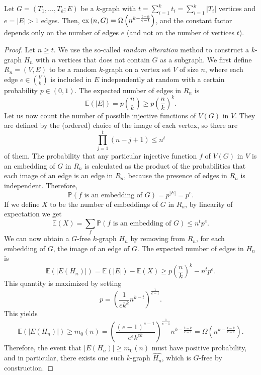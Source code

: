 \begin{proposition} \label{prop:probabilistic-lower-bound} %
    Let $G = (T_1, \dots, T_k; E)$ be a $k$-graph with
    $t = \sum_{i=1}^{k} t_i = \sum_{i=1}^{k} |T_i|$ vertices
    and $e = |E| > 1$ edges.
    Then, $\text{ex} \left( n, G \right) = \Omega\left(n^{k - \frac{t - k}{e - 1}} \right)$, and the
    constant factor depends only on the number of edges $e$ (and not on the number of vertices $t$).
    \begin{proof}
        Let $n \geq t$.
        We use the so-called \emph{random alteration} method to construct a $k$-graph
        $H_n$ with $n$ vertices that does not contain $G$ as a subgraph.
        We first define $R_n = (V, E)$ to be a random $k$-graph on a vertex set $V$ of size $n$,
        where each edge $e \in \binom{V}{k}$ is included in $E$ independently at random
        with a certain probability $p \in (0, 1)$.
        The expected number of edges in $R_n$ is
        \[
            \mathbb{E}(|E|) = p \binom{n}{k} \geq p \left( \frac{n}{k} \right)^k.
        \]
        Let us now count the number of possible injective functions of $V(G)$ in $V$.
        They are defined by the (ordered) choice of the image of each vertex, so there are
        \[
            \prod_{j=1}^{t} (n - j + 1) \leq n^t
        \]
        of them.
        The probability that any particular injective function $f$ of $V(G)$ in $V$ is an embedding of $G$ in $R_n$
        is calculated as the product of the probabilities that each image of an edge is an edge in $R_n$,
        because the presence of edges in $R_n$ is independent.
        Therefore,
        \[
            \mathbb{P}(f \text{ is an embedding of } G) = p^{|E|} = p^{e}.
        \]
        If we define $X$ to be the number of embeddings of $G$ in $R_n$, by linearity of expectation we get
        \[
            \mathbb{E}(X) = \sum_{f} \mathbb{P}(f \text{ is an embedding of } G) \leq n^t p^{e}.
        \]
        We can now obtain a $G$-free $k$-graph $H_n$ by removing from $R_n$, for each embedding of $G$,
        the image of an edge of $G$.
        The expected number of edges in $H_n$ is
        \[
            \mathbb{E}(|E(H_n)|) = \mathbb{E}(|E|) - \mathbb{E}(X) \geq
            p \left( \frac{n}{k} \right)^k - n^t p^{e}.
        \]
        This quantity is maximized by setting
        \[
            p = \left( \frac{1}{ek^k} n^{k-t} \right)^{\frac{1}{e-1}}.
        \]
        This yields
        \[
            \mathbb{E}(|E(H_n)|) \geq
            m_0(n) =
            \left( \frac{(e-1)^{e-1}}{e^e k^{ek}} \right)^{\frac{1}{e-1}} n^{k - \frac{t-k}{e-1}}
            = \Omega\left(n^{k - \frac{t-k}{e-1}} \right).
        \]
        Therefore, the event that $|E(H_n)| \geq m_0(n)$
        must have positive probability, and in particular,
        there exists one such $k$-graph $\widehat{H_n}$, which is $G$-free by construction.
    \end{proof}
\end{proposition}

